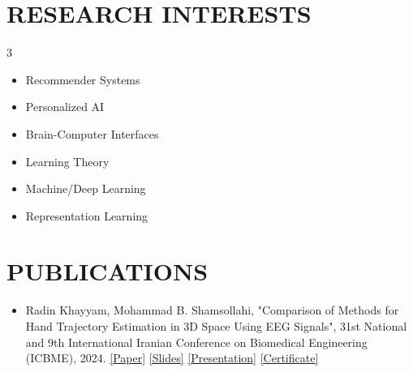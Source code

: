 \documentclass[11pt,a4paper,roman]{moderncv}        %
\begin{document}
	\section{RESEARCH INTERESTS}
  \vspace{-4mm}
	\begin{multicols}{3}
        \begin{itemize}
            \item Recommender Systems
            \item Personalized AI
            \columnbreak
            \item Brain-Computer Interfaces
            \item Learning Theory
            \columnbreak
            \item Machine/Deep Learning
            \item Representation Learning
        \end{itemize}
    \end{multicols}
    
    \vspace{-7mm}

    \section{PUBLICATIONS}
	\begin{itemize}
        \item {Radin Khayyam, Mohammad B. Shamsollahi, "Comparison of Methods for Hand Trajectory Estimation in 3D Space Using EEG Signals", 31st National and 9th International Iranian Conference on Biomedical Engineering (ICBME), 2024.} \href{https://ieeexplore.ieee.org/document/10895673}{\textcolor{blue link}{[Paper]}} \href{https://drive.google.com/file/d/1vfxfPBEQrINraJK8Xg00AbBsi5e0A8pd/view?usp=share_link}{\textcolor{blue link}{[Slides]}} \href{https://drive.google.com/file/d/1_hD0yy5rTJnOLmRosacjQF1sQa0NAspp/view?usp=share_link}{\textcolor{blue link}{[Presentation]}} \href{https://drive.google.com/file/d/1X8ppVzA7Sji_bE4F-lVzJHA7fwukOoqP/view?usp=share_link}{\textcolor{blue link}{[Certificate]}} 

        \end{itemize}

    
    \vspace{-3mm}
\end{document}

